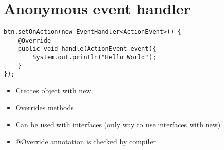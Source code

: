 \documentclass{article}[18pt]
\begin{document}
\section{Anonymous event handler}
\begin{verbatim}
btn.setOnAction(new EventHandler<ActionEvent>() {
	@Override                
	public void handle(ActionEvent event){
		System.out.println("Hello World");
	}            
});
\end{verbatim}
\begin{itemize}
	\item Creates object with new
	\item Overrides methods
	\item Can be used with interfaces (only way to use interfaces with new)
	\item @Override annotation is checked by compiler
\end{itemize}
\end{document}
